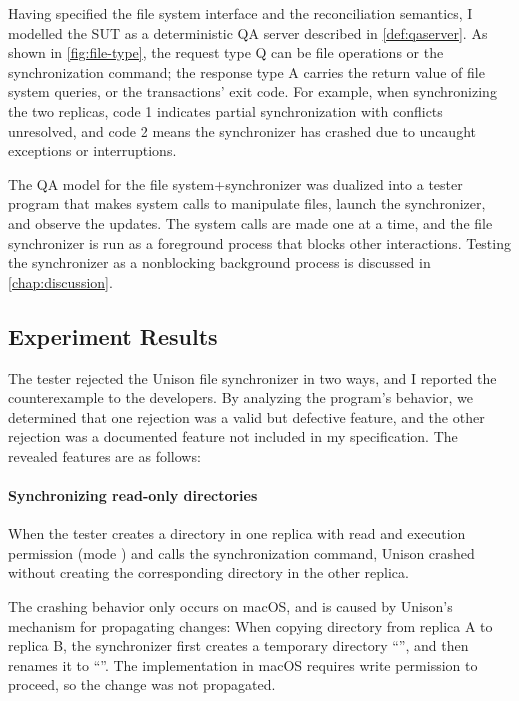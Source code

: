Having specified the file system interface and the reconciliation semantics, I
modelled the SUT as a deterministic QA server described in
\autoref{def:qaserver}.  As shown in \autoref{fig:file-type}, the request type
\ilc Q can be file operations or the synchronization command; the response type
\ilc A carries the return value of file system queries, or the transactions'
exit code.  For example, when synchronizing the two replicas, code 1 indicates
partial synchronization with conflicts unresolved, and code 2 means the
synchronizer has crashed due to uncaught exceptions or interruptions.

The QA model for the file system+synchronizer was dualized into a tester program
that makes system calls to manipulate files, launch the synchronizer, and
observe the updates.  The system calls are made one at a time, and the file
synchronizer is run as a foreground process that blocks other interactions.
Testing the synchronizer as a nonblocking background process is discussed in
\autoref{chap:discussion}.

\subsection{Experiment Results}
\label{sec:file-result}
The tester rejected the Unison file synchronizer in two ways, and I reported
the counterexample to the developers.  By analyzing the program's behavior, we
determined that one rejection was a valid but defective feature, and the other
rejection was a documented feature not included in my specification.  The
revealed features are as follows:

\paragraph{Synchronizing read-only directories}
When the tester creates a directory in one replica with read and execution
permission (mode ) and calls the synchronization command, Unison
crashed without creating the corresponding directory in the other replica.

The crashing behavior only occurs on macOS, and is caused by Unison's mechanism
for propagating changes: When copying directory  from replica \ilj A to
replica \ilj B, the synchronizer first creates a temporary directory
``'', and then renames it to ``''.
The  implementation in macOS requires write permission to
proceed, so the change was not propagated.

